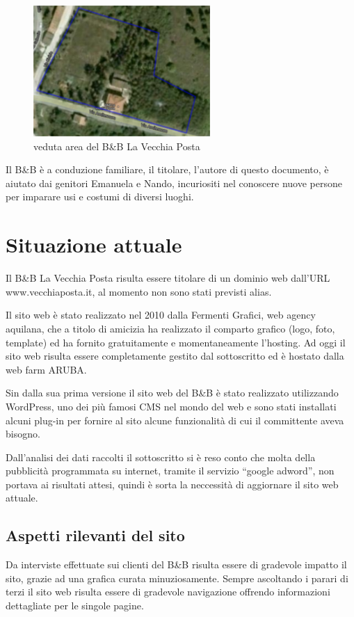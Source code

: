 \documentclass[a4paper,12pt,hidelinks]{report}
\begin{document}
  \begin{figure}[h!]%
    \includegraphics[width=0.6\textwidth,keepaspectratio=true]{img/bbArea1}
    \centering
    \caption{veduta area del B\&B La Vecchia Posta}%
    \label{fig:bbArea}%
  \end{figure}
  Il B\&B è a conduzione familiare, il titolare, l'autore di questo documento, è aiutato dai genitori Emanuela e Nando, incuriositi nel conoscere nuove persone per imparare usi e costumi di diversi luoghi.

\section{Situazione attuale}
  Il B\&B La Vecchia Posta risulta essere titolare di un dominio web dall'URL www.vecchiaposta.it, al momento non sono stati previsti alias. 
  \par Il sito web è stato realizzato nel 2010 dalla Fermenti Grafici, web agency aquilana, che a titolo di amicizia ha realizzato
  il comparto grafico (logo, foto, template) ed ha fornito gratuitamente e momentaneamente l'hosting.
  Ad oggi il sito web risulta essere completamente gestito dal sottoscritto ed è hostato dalla web farm ARUBA.
  \par Sin dalla sua prima versione il sito web del B\&B è stato realizzato utilizzando WordPress, uno dei più famosi CMS nel mondo del web e sono stati installati alcuni plug-in per fornire al sito alcune 
  funzionalità di cui il committente aveva bisogno.
  \par Dall'analisi dei dati raccolti il sottoscritto si è reso conto che molta della pubblicità programmata su internet, tramite il servizio ``google adword'', non portava ai risultati attesi,
  quindi è sorta la neccessità di aggiornare il sito web attuale.

\subsection{Aspetti rilevanti del sito}
  Da interviste effettuate sui clienti del B\&B risulta essere di gradevole impatto il sito, grazie ad una grafica curata minuziosamente.
  Sempre ascoltando i parari di terzi il sito web risulta essere di gradevole navigazione offrendo informazioni dettagliate per le singole pagine.
\end{document}
